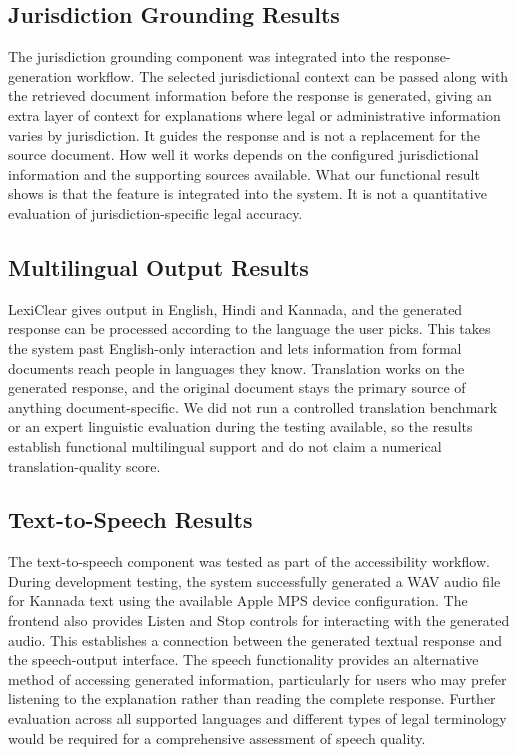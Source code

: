 \documentclass[12pt,a4paper,oneside]{report}
\begin{document}
\subsection{Jurisdiction Grounding Results}
The jurisdiction grounding component was integrated into the response-generation workflow. The selected jurisdictional context can be passed along with the retrieved document information before the response is generated, giving an extra layer of context for explanations where legal or administrative information varies by jurisdiction. It guides the response and is not a replacement for the source document. How well it works depends on the configured jurisdictional information and the supporting sources available. What our functional result shows is that the feature is integrated into the system. It is not a quantitative evaluation of jurisdiction-specific legal accuracy.

\subsection{Multilingual Output Results}
LexiClear gives output in English, Hindi and Kannada, and the generated response can be processed according to the language the user picks. This takes the system past English-only interaction and lets information from formal documents reach people in languages they know. Translation works on the generated response, and the original document stays the primary source of anything document-specific. We did not run a controlled translation benchmark or an expert linguistic evaluation during the testing available, so the results establish functional multilingual support and do not claim a numerical translation-quality score.

\subsection{Text-to-Speech Results}
The text-to-speech component was tested as part of the accessibility workflow. During development testing, the system successfully generated a WAV audio file for Kannada text using the available Apple MPS device configuration. The frontend also provides Listen and Stop controls for interacting with the generated audio. This establishes a connection between the generated textual response and the speech-output interface. The speech functionality provides an alternative method of accessing generated information, particularly for users who may prefer listening to the explanation rather than reading the complete response. Further evaluation across all supported languages and different types of legal terminology would be required for a comprehensive assessment of speech quality.
\end{document}

